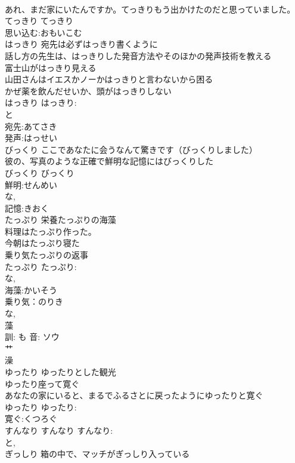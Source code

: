 \documentclass[8pt]{extreport}
\begin{document}
\begin{CJK}{UTF8}{min}
\\	あれ、まだ家にいたんですか。てっきりもう出かけたのだと思っていました。 
\\	てっきり			てっきり 
\\	思い込む:おもいこむ
\\	はっきり	宛先は必ずはっきり書くように 
\\	話し方の先生は、はっきりした発音方法やそのほかの発声技術を教える 
\\	富士山がはっきり見える 
\\	山田さんはイエスかノーかはっきりと言わないから困る 
\\	かぜ薬を飲んだせいか、頭がはっきりしない 
\\	はっきり			はっきり:
\\	と 
\\	宛先:あてさき
\\	発声:はっせい
\\	びっくり	ここであなたに会うなんて驚きです（びっくりしました） 
\\	彼の、写真のような正確で鮮明な記憶にはびっくりした 
\\	びっくり			びっくり
\\	鮮明:せんめい
\\	な, 
\\	記憶:きおく
\\	たっぷり	栄養たっぷりの海藻 
\\	料理はたっぷり作った。 
\\	今朝はたっぷり寝た 
\\	乗り気たっぷりの返事 
\\	たっぷり			たっぷり:
\\	な, 
\\	海藻:かいそう
\\	乗り気：のりき
\\	な, 
\\	藻 
\\	訓: も 音: ソウ 
\\	艹 
\\	澡 
\\	ゆったり	ゆったりとした観光 
\\	ゆったり座って寛ぐ 
\\	あなたの家にいると、まるでふるさとに戻ったようにゆったりと寛ぐ 
\\	ゆったり			ゆったり:
\\	寛ぐ:くつろぐ
\\	すんなり		すんなり			すんなり:
\\	と, 
\\	ぎっしり	箱の中で、マッチがぎっしり入っている 

\end{CJK}
\end{document}
